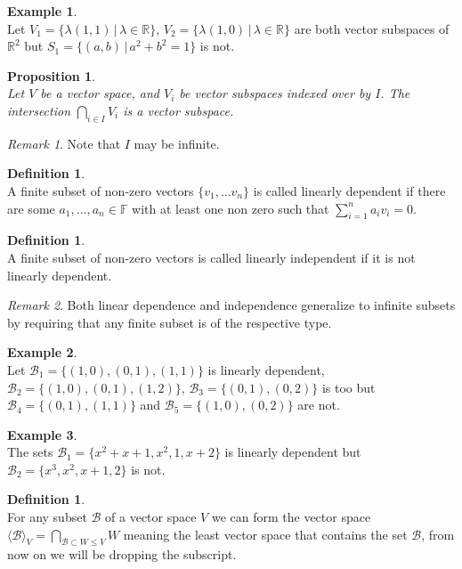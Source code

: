 \documentclass[12pt]{article}
\newcommand{\double}{\hspace{2pt}}
\newtheorem{prop}[theorem]{Proposition}
\theoremstyle{definition}
\newtheorem{definition}[theorem]{Definition}
\newtheorem*{example}{Example}
\theoremstyle{remark}
\newtheorem*{remark}{Remark}
\theoremstyle{plain}
\begin{document}
\begin{example}\leavevmode \\
    Let $V_1=\{ \lambda(1,1) \double | \double \lambda \in \mathbb{R}\}$, $V_2=\{ \lambda(1,0) \double | \double \lambda \in \mathbb{R}\}$ are both vector subspaces of $\mathbb{R}^2$ but $S_1=\{ (a,b) \double | \double a^2+b^2=1\}$ is not.
\end{example}
\begin{prop}\leavevmode \\
    Let $V$ be a vector space, and $V_i$ be vector subspaces indexed over by $I$. The intersection $\bigcap\limits_{i\in I} V_i$ is a vector subspace.
\end{prop}
\begin{remark}
    Note that $I$ may be infinite.
\end{remark}
\begin{definition}\leavevmode \\
    A finite subset of non-zero vectors $\{ v_1,\ldots v_n \}$ is called linearly dependent if there are some $a_1, \ldots , a_n \in \mathbb{F}$ with at least one non zero such that $\sum\limits_{i=1}^na_iv_i=0$.
\end{definition}
\begin{definition}\leavevmode \\
    A finite subset of non-zero vectors is called linearly independent if it is not linearly dependent.
\end{definition}
\begin{remark}
Both linear dependence and independence generalize to infinite subsets by requiring that any finite subset is of the respective type.
\end{remark}
\begin{example}\leavevmode \\
     Let $\mathcal{B}_1=\{ (1,0), (0,1),(1,1)\}$ is linearly dependent, $\mathcal{B}_2=\{ (1,0), (0,1),(1,2)\}$, $\mathcal{B}_3=\{ (0,1),(0,2)\}$ is too but $\mathcal{B}_4=\{ (0,1),(1,1)\}$ and $\mathcal{B}_5=\{ (1,0), (0,2)\}$ are not.
\end{example}
\begin{example}\leavevmode \\
    The sets $\mathcal{B}_1=\{ x^2+x+1, x^2,1,x+2\}$ is linearly dependent but $\mathcal{B}_2=\{ x^3,x^2,x+1,2\}$ is not.
\end{example}
\begin{definition}\leavevmode \\
    For any subset $\mathcal{B}$ of a vector space $V$ we can form the vector space $\langle \mathcal{B}\rangle_V=\bigcap_{\mathcal{B}\subset W \leq V} W$ meaning the least vector space that contains the set $\mathcal{B}$, from now on we will be dropping the subscript.
\end{definition}
\end{document}
